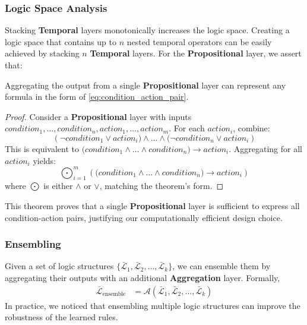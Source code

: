 \subsubsection{Logic Space Analysis}
\label{sec:logic_space_analysis}
Stacking \textbf{Temporal} layers monotonically increases the logic space. Creating a logic space that contains up to $n$ nested temporal operators can be easily achieved by stacking $n$ \textbf{Temporal} layers. For the \textbf{Propositional} layer, we assert that:

\begin{theorem}
    Aggregating the output from a single \textbf{Propositional} layer can represent any formula in the form of \eqref{eq:condition_action_pair}.
\end{theorem}

\begin{proof}
    Consider a \textbf{Propositional} layer with inputs ${\mathit{condition_1, \ldots, condition_n, action_1, \ldots, action_m}}$. For each $\mathit{action_i}$, combine:
    $$(\lnot \mathit{condition_1 \lor action_i) \land \ldots \land (\lnot condition_n \lor action_i})$$
    This is equivalent to $(\mathit{condition_1 \land \ldots \land condition_n) \rightarrow action_i}$. Aggregating for all $\mathit{action_i}$ yields:
    $$\bigodot_{i=1}^m \left((\mathit{condition_1 \land \ldots \land condition_n) \rightarrow action_i}\right)$$
    where $\bigodot$ is either $\land$ or $\lor$, matching the theorem's form.
\end{proof}

This theorem proves that a single \textbf{Propositional} layer is sufficient to express all condition-action pairs, justifying our computationally efficient design choice.


\subsubsection{Ensembling}
\label{sec:ensembling}

Given a set of logic structures $\{\bar{\mathcal{L}}_1, \bar{\mathcal{L}}_2, \ldots, \bar{\mathcal{L}}_k\}$, we can ensemble them by aggregating their outputs with an additional \textbf{Aggregation} layer. Formally,
\begin{equation}
    \begin{aligned}
        \bar{\mathcal{L}}_{\text{ensemble}} & = \mathcal{A}(\bar{\mathcal{L}}_1, \bar{\mathcal{L}}_2, \ldots, \bar{\mathcal{L}}_k)
    \end{aligned}
\end{equation}
In practice, we noticed that ensembling multiple logic structures can improve the robustness of the learned rules.


